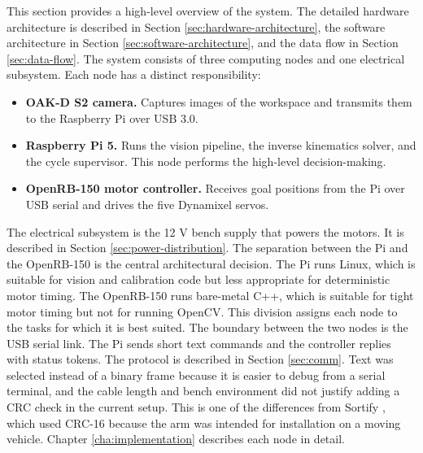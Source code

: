 \label{sec:system-architecture-overview}
This section provides a high-level overview of the system. The detailed
hardware architecture is described in Section \ref{sec:hardware-architecture},
the software architecture in Section \ref{sec:software-architecture},
and the data flow in Section \ref{sec:data-flow}.
The system consists of three computing nodes and one electrical
subsystem. Each node has a distinct responsibility:
\begin{itemize}
 \item \textbf{OAK-D S2 camera.} Captures images of the workspace and
 transmits them to the Raspberry Pi over USB 3.0.
 \item \textbf{Raspberry Pi 5.} Runs the vision pipeline, the inverse
 kinematics solver, and the cycle supervisor. This node performs the
 high-level decision-making.
 \item \textbf{OpenRB-150 motor controller.} Receives goal positions
 from the Pi over USB serial and drives the five Dynamixel servos.
\end{itemize}
The electrical subsystem is the 12 V bench supply that powers the
motors. It is described in Section \ref{sec:power-distribution}.
The separation between the Pi and the OpenRB-150 is the central
architectural decision. The Pi runs Linux, which is suitable for vision
and calibration code but less appropriate for deterministic motor timing.
The OpenRB-150 runs bare-metal C++, which is suitable for tight motor
timing but not for running OpenCV. This division assigns each node to
the tasks for which it is best suited.
The boundary between the two nodes is the USB serial link. The Pi
sends short text commands and the controller replies with status
tokens. The protocol is described in Section \ref{sec:comm}. Text was
selected instead of a binary frame because it is easier to debug from a
serial terminal, and the cable length and bench environment did not
justify adding a CRC check in the current setup. This is one of the
differences from Sortify \cite{sortify}, which used CRC-16 because the
arm was intended for installation on a moving vehicle.
Chapter \ref{cha:implementation} describes each node in detail.
